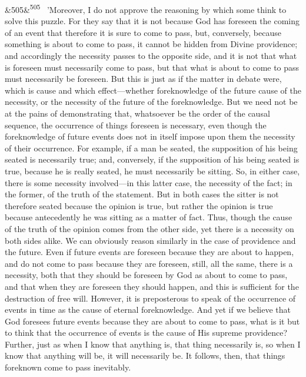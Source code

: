 \documentclass[12pt]{article}
\newcommand{\para}[1][]{\par\noindent\ifx&#1&\else\textsuperscript{\footnotesize #1}~\fi}
\begin{document}
\para[505] 'Moreover, I do not approve the reasoning by which some think to solve this puzzle. For they say that it is not because God has foreseen the coming of an event that therefore it is sure to come to pass, but, conversely, because something is about to come to pass, it cannot be hidden from Divine providence; and accordingly the necessity passes to the opposite side, and it is not that what is foreseen must necessarily come to pass, but that what is about to come to pass must necessarily be foreseen. But this is just as if the matter in debate were, which is cause and which effect---whether foreknowledge of the future cause of the necessity, or the necessity of the future of the foreknowledge. But we need not be at the pains of demonstrating that, whatsoever be the order of the causal sequence, the occurrence of things foreseen is necessary, even though the foreknowledge of future events does not in itself impose upon them the necessity of their occurrence. For example, if a man be seated, the supposition of his being seated is necessarily true; and, conversely, if the supposition of his being seated is true, because he is really seated, he must necessarily be sitting. So, in either case, there is some necessity involved---in this latter case, the necessity of the fact; in the former, of the truth of the statement. But in both cases the sitter is not therefore seated because the opinion is true, but rather the opinion is true because antecedently he was sitting as a matter of fact. Thus, though the cause of the truth of the opinion comes from the other side, yet there is a necessity on both sides alike. We can obviously reason similarly in the case of providence and the future. Even if future events are foreseen because they are about to happen, and do not come to pass because they are foreseen, still, all the same, there is a necessity, both that they should be foreseen by God as about to come to pass, and that when they are foreseen they should happen, and this is sufficient for the destruction of free will. However, it is preposterous to speak of the occurrence of events in time as the cause of eternal foreknowledge. And yet if we believe that God foresees future events because they are about to come to pass, what is it but to think that the occurrence of events is the cause of His supreme providence? Further, just as when I know that anything is, that thing necessarily is, so when I know that anything will be, it will necessarily be. It follows, then, that things foreknown come to pass inevitably.
\end{document}
